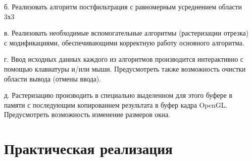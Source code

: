 \documentclass[a4paper, 14pt]{extarticle}
\begin{document}
б. Реализовать алгоритм постфильтрация с равномерным усреднением области 3х3

в. Реализовать необходимые вспомогательные алгоритмы (растеризации отрезка) с
модификациями, обеспечивающими корректную работу основного алгоритма.

г. Ввод исходных данных каждого из алгоритмов производится интерактивно с помощью
клавиатуры и/или мыши. Предусмотреть также возможность очистки области вывода (отмены
ввода).

д. Растеризацию производить в специально выделенном для этого буфере в памяти с
последующим копированием результата в буфер кадра OpenGL. Предусмотреть возможность
изменение размеров окна.
\pagebreak
\section{Практическая реализация}
\end{document}
